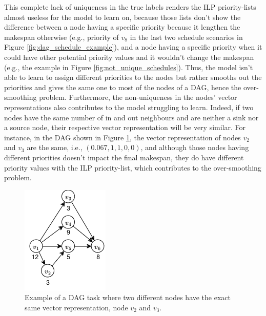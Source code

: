 This complete lack of uniqueness in the true labels 
renders the ILP priority-lists almost useless
for the model to learn on, because those lists
don't show the difference between a node having 
a specific priority because it lengthen the makespan otherwise (e.g.,
priority of $v_8$ in the last two schedule scenarios in Figure \ref{fig:dag_schedule_example}),
and a node having a specific priority when it could have 
other potential priority values and it wouldn't change the makespan (e.g.,
the example in Figure \ref{fig:not_unique_schedules}).
Thus, the model isn't able to learn to assign different priorities
to the nodes but rather smooths out the priorities and gives
the same one to most of the nodes of a DAG,
hence the over-smoothing problem.
Furthermore, the non-uniqueness in the nodes' vector representations
also contributes to the model struggling to learn.
Indeed, 
if two nodes have the same number of in and out neighbours and
are neither a sink nor a source node, their respective
vector representation will be very similar.
For instance, in the DAG shown in Figure \ref{fig:dag_same_representation_vector},
the vector representation of nodes $v_2$ and $v_3$ are the same,
i.e., $(0.067, 1, 1, 0, 0)$, and although those nodes having different priorities
doesn't impact the final makespan, they do have different priority values
with the ILP priority-list, which contributes to the over-smoothing problem. 
\begin{figure}
    \centering
    \includegraphics[width=0.5\linewidth]{images/dag_similarity_representation.png}
    \caption{Example of a DAG task where two different nodes have the
    exact same vector representation, node $v_2$ and $v_3$.}
    \label{fig:dag_same_representation_vector}
\end{figure}

